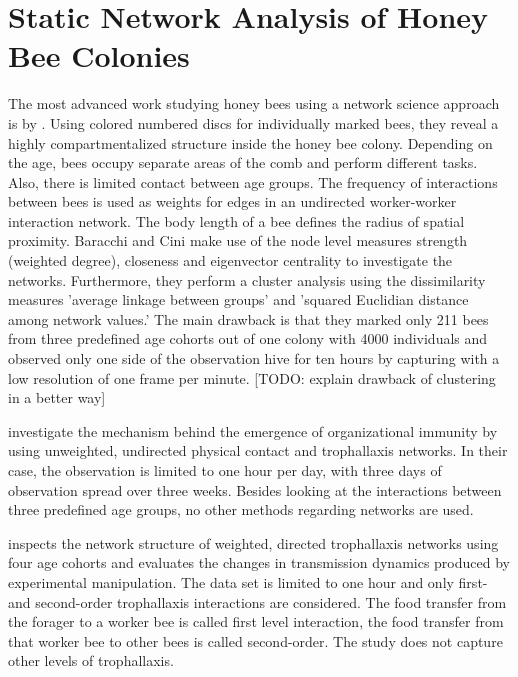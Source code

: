 \section{Static Network Analysis of Honey Bee Colonies}

The most advanced work studying honey bees using a network science approach is by \textcite{baracchi2014socio}.
Using colored numbered discs for individually marked bees, they reveal a highly compartmentalized structure inside the honey bee colony.
Depending on the age, bees occupy separate areas of the comb and perform different tasks. Also, there is limited contact between age groups.
The frequency of interactions between bees is used as weights for edges in an undirected worker-worker interaction network. The body length of a bee defines the radius of spatial proximity.
Baracchi and Cini make use of the node level measures strength (weighted degree), closeness and eigenvector centrality to investigate the networks.
Furthermore, they perform a cluster analysis using the dissimilarity measures ’average linkage between groups’ and ’squared Euclidian distance among network values.'
The main drawback is that they marked only 211 bees from three predefined age cohorts out of one colony with 4000 individuals and observed only one side of the observation hive for ten hours by capturing with a low resolution of one frame per minute. [TODO: explain drawback of clustering in a better way]


\textcite{scholl2011olfactory} investigate the mechanism behind the emergence of organizational immunity by using unweighted, undirected physical contact and trophallaxis networks.
In their case, the observation is limited to one hour per day, with three days of observation spread over three weeks.
Besides looking at the interactions between three predefined age groups, no other methods regarding networks are used.


\textcite{naug2008structure} inspects the network structure of weighted, directed trophallaxis networks using four age cohorts and evaluates the changes in transmission dynamics produced by experimental manipulation.
The data set is limited to one hour and only first- and second-order trophallaxis interactions are considered. The food transfer from the forager to a worker bee is called first level interaction, the food transfer from that worker bee to other bees is called second-order. The study does not capture other levels of trophallaxis.


